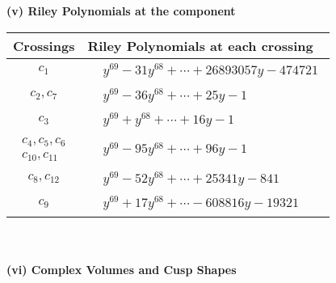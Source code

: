 \documentclass[1p]{elsarticle_modified}
\theoremstyle{definition}
\begin{document}
\newpage\renewcommand{\arraystretch}{1}
\flushleft \textbf{(v) Riley Polynomials at the component}\newline \\
\begin{tabular}{m{50pt}|m{274pt}}
Crossings & \hspace{64pt}Riley Polynomials at each crossing \\
\hline $$\begin{aligned}c_{1}\end{aligned}$$&$\begin{aligned}
&y^{69}-31 y^{68}+\cdots+26893057 y-474721
\end{aligned}$\\
\hline $$\begin{aligned}c_{2},c_{7}\end{aligned}$$&$\begin{aligned}
&y^{69}-36 y^{68}+\cdots+25 y-1
\end{aligned}$\\
\hline $$\begin{aligned}c_{3}\end{aligned}$$&$\begin{aligned}
&y^{69}+y^{68}+\cdots+16 y-1
\end{aligned}$\\
\hline $$\begin{aligned}c_{4},c_{5},c_{6}\\c_{10},c_{11}\end{aligned}$$&$\begin{aligned}
&y^{69}-95 y^{68}+\cdots+96 y-1
\end{aligned}$\\
\hline $$\begin{aligned}c_{8},c_{12}\end{aligned}$$&$\begin{aligned}
&y^{69}-52 y^{68}+\cdots+25341 y-841
\end{aligned}$\\
\hline $$\begin{aligned}c_{9}\end{aligned}$$&$\begin{aligned}
&y^{69}+17 y^{68}+\cdots-608816 y-19321
\end{aligned}$\\
\hline
\end{tabular}\\~\\
\newpage\flushleft \textbf{(vi) Complex Volumes and Cusp Shapes}
\end{document}
